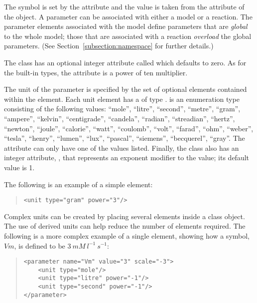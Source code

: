 \documentclass[10pt]{cek-article}
\begin{document}
The symbol is set by the  attribute and the value is taken
from the  attribute of the  object.  A
parameter can be associated with either a model or a reaction.  The
parameter elements associated with the model define parameters that are
{\em global} to the whole model; those that are associated with a reaction
{\em overload} the global parameters.  (See
Section~\ref{subsection:namespace} for further details.)

The  class has an optional integer attribute
called  which defaults to zero.  As for the
built-in types, the  attribute is a power of ten
multiplier.

The unit of the parameter  is specified by the set of
optional  elements contained within the 
element.  Each unit element has a  of type
.   is an enumeration type consisting of
the following values: ``mole'', ``litre'', ``second'', ``metre'', ``gram'', ``ampere'',
``kelvin'', ``centigrade'', ``candela'', ``radian'', ``streadian'', ``hertz'',
``newton'', ``joule'', ``calorie'', ``watt'', ``coulomb'', ``volt'', ``farad'', ``ohm'',
``weber'', ``tesla'', ``henry'', ``lumen'', ``lux'', ``pascal'', ``siemens'',
``becquerel'', ``gray''.  The attribute  can only have one of the
values listed.  Finally, the  class also has an integer
attribute, , that represents an exponent modifier to the
 value; its default value is 1.

The following is an example of a simple  element:
\begin{quote}
  \begin{small}
    \tightspacing
\begin{verbatim}
<unit type="gram" power="3"/>
\end{verbatim}
    \regularspacing
  \end{small}
\end{quote}

Complex units can be created by placing several 
elements inside a  class object.  The use of
derived units can help reduce the number of elements required.
The following is a more complex example of a single
 element, showing how a symbol, $Vm$, is defined
to be $3\ mM\ l^{-1}\ s^{-1}$:
\begin{quote}
  \begin{small}
    \tightspacing
\begin{verbatim}
<parameter name="Vm" value="3" scale="-3">
    <unit type="mole"/>
    <unit type="litre" power="-1"/>
    <unit type="second" power="-1"/>
</parameter>
\end{verbatim}
    \regularspacing
  \end{small}
\end{quote}
\end{document}
